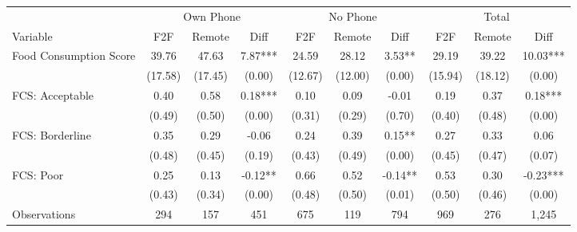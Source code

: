 \begin{tabular}{l*{9}c}
\hline\hline
 & \multicolumn{3}{c}{Own Phone} & \multicolumn{3}{c}{No Phone} & \multicolumn{3}{c}{Total}\\ 
Variable & F2F & Remote & Diff & F2F & Remote & Diff & F2F & Remote & Diff \\
\hline
Food Consumption Score&39.76&47.63&7.87***&24.59&28.12&3.53**&29.19&39.22&10.03***\\
&(17.58)&(17.45)&(0.00)&(12.67)&(12.00)&(0.00)&(15.94)&(18.12)&(0.00)\\
FCS: Acceptable&0.40&0.58&0.18***&0.10&0.09&-0.01&0.19&0.37&0.18***\\
&(0.49)&(0.50)&(0.00)&(0.31)&(0.29)&(0.70)&(0.40)&(0.48)&(0.00)\\
FCS: Borderline&0.35&0.29&-0.06&0.24&0.39&0.15**&0.27&0.33&0.06\\
&(0.48)&(0.45)&(0.19)&(0.43)&(0.49)&(0.00)&(0.45)&(0.47)&(0.07)\\
FCS: Poor&0.25&0.13&-0.12**&0.66&0.52&-0.14**&0.53&0.30&-0.23***\\
&(0.43)&(0.34)&(0.00)&(0.48)&(0.50)&(0.01)&(0.50)&(0.46)&(0.00)\\
\hline
Observations & 294 & 157 & 451 & 675 & 119 & 794 & 969 & 276 & 1,245 \\
\hline\hline
\end{tabular}
